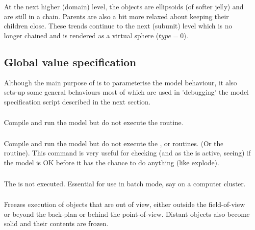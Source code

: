 At the next higher (domain) level, the objects are ellipsoids (of softer jelly) and are still
in a chain.  Parents are also a bit more relaxed about keeping their children close.  These
trends continue to the next (subunit) level which is no longer chained and is rendered as a
virtual sphere ($type = 0$).
 

\subsection{Global value specification}

Although the main purpose of  is to parameterise the model behaviour, it also
sets-up some general behaviours most of which are used in 'debugging' the model specification
script described in the next section.

\subsubsection{}

Compile and run the model but do not execute the  routine.

\subsubsection{}

Compile and run the model but do not execute the ,  or  routines.
(Or the  routine).
This command is very useful for checking (and as the  is active, seeing) if the model 
is OK before it has the chance to do anything (like explode).

\subsubsection{}

The  is not executed.   Essential for use in batch mode, say on a computer cluster.

\subsubsection{}

Freezes execution of objects that are out of view, either outside the field-of-view or
beyond the back-plan or behind the point-of-view.   Distant objects also become solid and
their contents are frozen.

\subsubsection{}

